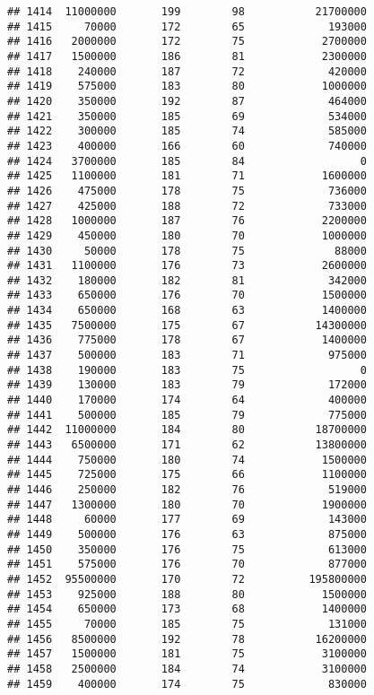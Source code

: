 \documentclass[
]{article}
\begin{document}
\begin{verbatim}
## 1414  11000000       199        98           21700000
## 1415     70000       172        65             193000
## 1416   2000000       172        75            2700000
## 1417   1500000       186        81            2300000
## 1418    240000       187        72             420000
## 1419    575000       183        80            1000000
## 1420    350000       192        87             464000
## 1421    350000       185        69             534000
## 1422    300000       185        74             585000
## 1423    400000       166        60             740000
## 1424   3700000       185        84                  0
## 1425   1100000       181        71            1600000
## 1426    475000       178        75             736000
## 1427    425000       188        72             733000
## 1428   1000000       187        76            2200000
## 1429    450000       180        70            1000000
## 1430     50000       178        75              88000
## 1431   1100000       176        73            2600000
## 1432    180000       182        81             342000
## 1433    650000       176        70            1500000
## 1434    650000       168        63            1400000
## 1435   7500000       175        67           14300000
## 1436    775000       178        67            1400000
## 1437    500000       183        71             975000
## 1438    190000       183        75                  0
## 1439    130000       183        79             172000
## 1440    170000       174        64             400000
## 1441    500000       185        79             775000
## 1442  11000000       184        80           18700000
## 1443   6500000       171        62           13800000
## 1444    750000       180        74            1500000
## 1445    725000       175        66            1100000
## 1446    250000       182        76             519000
## 1447   1300000       180        70            1900000
## 1448     60000       177        69             143000
## 1449    500000       176        63             875000
## 1450    350000       176        75             613000
## 1451    575000       176        70             877000
## 1452  95500000       170        72          195800000
## 1453    925000       188        80            1500000
## 1454    650000       173        68            1400000
## 1455     70000       185        75             131000
## 1456   8500000       192        78           16200000
## 1457   1500000       181        75            3100000
## 1458   2500000       184        74            3100000
## 1459    400000       174        75             830000

\end{verbatim}
\end{document}
